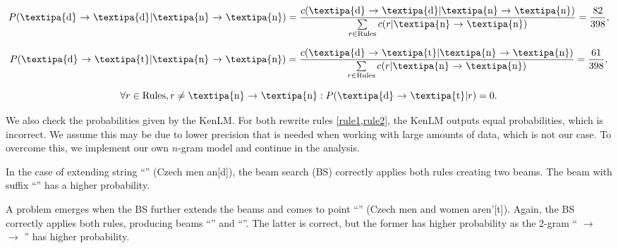 \begin{equation}\label{rule1}
    P( \textnormal{\textipa{d} $\rightarrow$ \textipa{d}} | \textnormal{\textipa{n} $\rightarrow$ \textipa{n}}) =
    \frac{
        c( \textnormal{\textipa{d} $\rightarrow$ \textipa{d}} | \textnormal{\textipa{n} $\rightarrow$ \textipa{n}})
    }{
        \sum\limits_{r \in \textnormal{Rules}} c( r | \textnormal{\textipa{n} $\rightarrow$ \textipa{n}})
    } =
    \frac{82}{398},
\end{equation}

\begin{equation}\label{rule2}
P( \textnormal{\textipa{d} $\rightarrow$ \textipa{t}} | \textnormal{\textipa{n} $\rightarrow$ \textipa{n}}) =
\frac{
    c( \textnormal{\textipa{d} $\rightarrow$ \textipa{t}} | \textnormal{\textipa{n} $\rightarrow$ \textipa{n}})
}{
    \sum\limits_{r \in \textnormal{Rules}} c( r | \textnormal{\textipa{n} $\rightarrow$ \textipa{n}})
} =
\frac{61}{398},
\end{equation}

\begin{equation}
\forall r \in \textnormal{Rules}, r \neq \textnormal{\textipa{n} $\rightarrow$ \textipa{n}}: P( \textnormal{\textipa{d} $\rightarrow$ \textipa{t}} | r) = 0.
\end{equation}

We also check the probabilities given by the KenLM. For both rewrite rules \cref{rule1,rule2}, the KenLM outputs equal probabilities, which is incorrect. We assume this may be due to lower precision that is needed when working with large amounts of data, which is not our case. To overcome this, we implement our own $n$-gram model and continue in the analysis.

In the case of extending string ``'' (Czech men an[d]), the beam search (BS) correctly applies both rules creating two beams. The beam with suffix ``'' has a higher probability.

A problem emerges when the BS further extends the beams and comes to point ``'' (Czech men and women aren'[t]). Again, the BS correctly applies both rules, producing beams ``'' and ``''. The latter is correct, but the former has higher probability as the 2-gram `` $\rightarrow$   $\rightarrow$ '' has higher probability.

